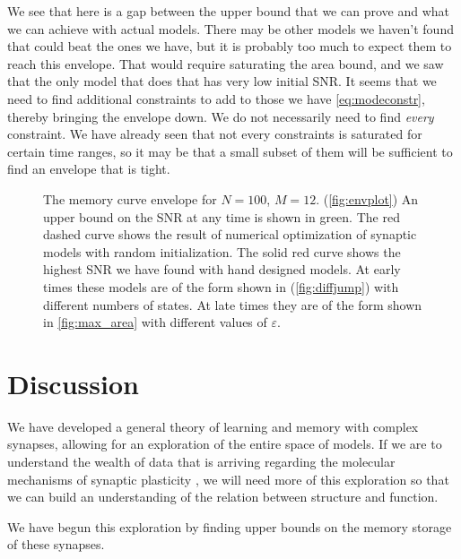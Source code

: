 \documentclass{article} %
\begin{document}
We see that here is a gap between the upper bound that we can prove and what we can achieve with actual models.
There may be other models we haven't found that could beat the ones we have, but it is probably too much to expect them to reach this envelope.
That would require saturating the area bound, and we saw that the only model that does that has very low initial SNR.
It seems that we need to find additional constraints to add to those we have \eqref{eq:modeconstr}, thereby bringing the envelope down.
We do not necessarily need to find \emph{every} constraint.
We have already seen that not every constraints is saturated for certain time ranges, so it may be that a small subset of them will be sufficient to find an envelope that is tight.






\begin{figure}
 \begin{center}
 \begin{myenuma}
  \item{}\label{fig:envplot}\hp
  \item{}\label{fig:diffjump}
 \end{myenuma}
 \end{center}
  \caption{The memory curve envelope for $N=100$, $M=12$.
  (\ref{fig:envplot}) An upper bound on the SNR at any time is shown in green.
  The red dashed curve shows the result of numerical optimization of synaptic models with random initialization.
  The solid red curve shows the highest SNR we have found with hand designed models.
  At early times these models are of the form shown in (\ref{fig:diffjump}) with different numbers of states.
  At late times they are of the form shown in \autoref{fig:max_area} with different values of $\varepsilon$.
  }\label{fig:env}
\end{figure}







\section{Discussion}\label{sec:disc}

We have developed a general theory of learning and memory with complex synapses, allowing for an exploration of the entire space of models.
If we are to understand the wealth of data that is arriving regarding the molecular mechanisms of synaptic plasticity \cite{Bliss1993LTP,Bredt2003AMPA,Coba2009phosphorylation}, we will need more of this exploration so that we can build an understanding of the relation between structure and function.

We have begun this exploration by finding upper bounds on the memory storage of these synapses.








\end{document}
